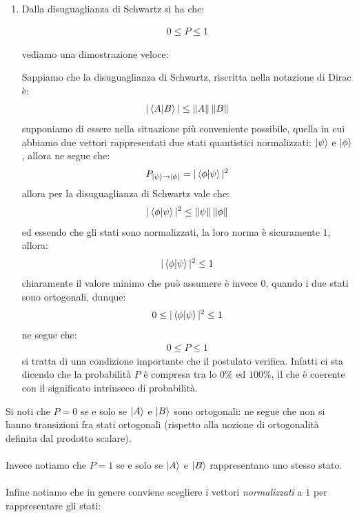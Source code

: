 \begin{enumerate}[label=\arabic*)]
	\item Dalla disuguaglianza di Schwartz si ha che: 
	\begin{nb}
	\begin{align*}
		0 \leq P \leq 1
	\end{align*}
	\end{nb}
		vediamo una dimostrazione veloce:
	\begin{myprf}
		Sappiamo che la disuguaglianza di Schwartz, riscritta nella notazione di Dirac è:
	\begin{align*}
		|\braket{A}{B}| \leq \|A\| \, \|B\|
	\end{align*}
		supponiamo di essere nella situazione più conveniente possibile, quella in cui abbiamo due vettori rappresentati due stati quantistici normalizzati: $\ket{\psi}$ e $\ket{\phi}$, allora ne segue che:
	\begin{align*}
		P_{\ket{\psi} \to \ket{\phi}} = |\braket{\phi}{\psi}|^2
	\end{align*}	
		allora per la disuguaglianza di Schwartz vale che:
	\begin{align*}
		 |\braket{\phi}{\psi}|^2 \leq \|\psi\| \, \| \phi \|
	\end{align*} 
		ed essendo che gli stati sono normalizzati, la loro norma è sicuramente $1$, allora:
	\begin{align*}
		 |\braket{\phi}{\psi}|^2 \leq 1
	\end{align*} 
		chiaramente il valore minimo che può assumere è invece $0$, quando i due stati sono ortogonali, dunque:
	\begin{align*}
		0 \leq |\braket{\phi}{\psi}|^2 \leq 1
	\end{align*} 
		ne segue che:
	\begin{align*}
		0 \leq P \leq 1
	\end{align*}
		si tratta di una condizione importante che il postulato verifica. Infatti ci sta dicendo che la probabilità $P$ è compresa tra lo $0\%$ ed $100\%$, il che è coerente con il significato intrinseco di probabilità.
	\end{myprf}
\end{enumerate}

	Si noti che $P = 0$ se e solo se $\ket{A}$ e $\ket{B}$ sono ortogonali: ne segue che non si hanno transizioni fra stati ortogonali (rispetto alla nozione di ortogonalità definita dal prodotto scalare).
	\\
	\\
	Invece notiamo che $P = 1$ se e solo se $\ket{A}$ e $\ket{B}$ rappresentano uno stesso stato.
	\\
	\\
	Infine notiamo che in genere conviene scegliere i vettori \textit{normalizzati} a $1$ per rappresentare gli stati:
	
